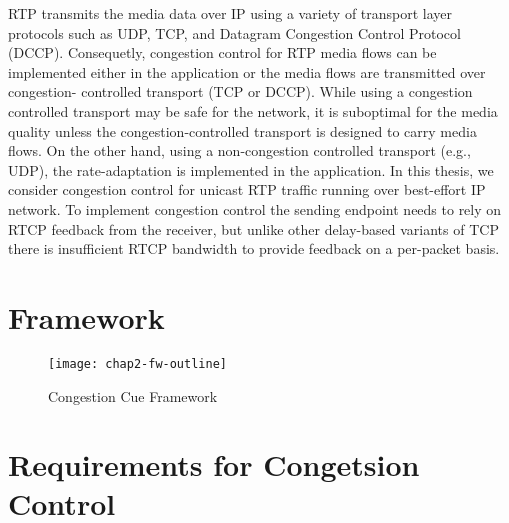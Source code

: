 
RTP transmits the media data over IP using a variety of transport layer
protocols such as UDP, TCP, and Datagram Congestion Control Protocol (DCCP).
Consequetly, congestion control for RTP media flows can be implemented either
in the application or the media flows are transmitted over congestion-
controlled transport (TCP or DCCP). While using a congestion controlled
transport may be safe for the network, it is suboptimal for the media quality
unless the congestion-controlled transport is designed to carry media flows.
On the other hand, using a non-congestion controlled transport (e.g., UDP),
the rate-adaptation is implemented in the application. In this thesis, we
consider congestion control for unicast RTP traffic running over best-effort
IP network. To implement congestion control the sending endpoint needs to rely
on RTCP feedback from the receiver, but unlike other delay-based variants of
TCP there is insufficient RTCP bandwidth to provide feedback on a per-packet
basis.


\section{Framework}
\label{fw.fw}


\begin{figure}
\texttt{[image: chap2-fw-outline]}
\caption{Congestion Cue Framework}
\label{fig:4:fw}
\end{figure}


\section{Requirements for Congetsion Control}
\label{fw.cc.eval}